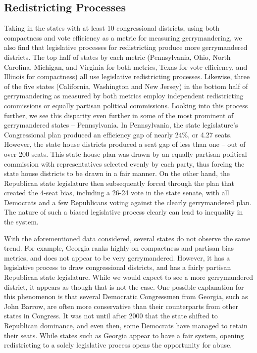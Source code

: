 \documentclass[12pt]{article}
\begin{document}
 \subsection{Redistricting Processes}
Taking in the states with at least 10 congressional districts, using both compactness and vote efficiency as a metric for measuring gerrymandering, we also find that legislative processes for redistricting produce more gerrymandered districts. The top half of states by each metric (Pennsylvania, Ohio, North Carolina, Michigan, and Virginia for both metrics, Texas for vote efficiency, and Illinois for compactness) all use legislative redistricting processes.  Likewise, three of the five states (California, Washington and New Jersey) in the bottom half of gerrymandering as measured by both metrics employ independent redistricting commissions or equally partisan political commissions.
Looking into this process further, we see this disparity even further in some of the most prominent of gerrymandered states -- Pennsylvania.  In Pennsylvania, the state legislature's Congressional plan produced an efficiency gap of nearly 24\%, or 4.27 seats.  However, the state house districts produced a seat gap of less than one -- out of over 200 seats.  This state house plan was drawn by an equally partisan political commission with representatives selected evenly by each party, thus forcing the state house districts to be drawn in a fair manner.  On the other hand, the Republican state legislature then subsequently forced through the plan that created the 4-seat bias, including a 26-24 vote in the state senate, with all Democrats and a few Republicans voting against the clearly gerrymandered plan.  The nature of such a biased legislative process clearly can lead to inequality in the system.

With the aforementioned data considered, several states do not observe the same trend.  For example, Georgia ranks highly on compactness and partisan bias metrics, and does not appear to be very gerrymandered.  However, it has a legislative process to draw congressional districts, and has a fairly partisan Republican state legislature.  While we would expect to see a more gerrymandered district, it appears as though that is not the case.  One possible explanation for this phenomenon is that several Democratic Congressmen from Georgia, such as John Barrow, are often more conservative than their counterparts from other states in Congress.  It was not until after 2000 that the state shifted to Republican dominance, and even then, some Democrats have managed to retain their seats.  While states such as Georgia appear to have a fair system, opening redistricting to a solely legislative process opens the opportunity for abuse.
\end{document}
